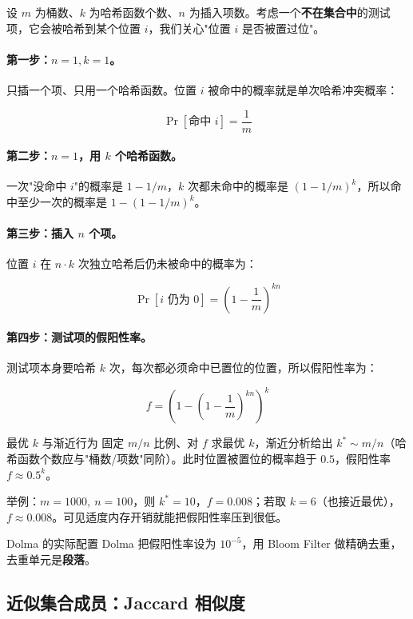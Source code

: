 \documentclass[a4paper]{article}
\begin{document}
设 $m$ 为桶数、$k$ 为哈希函数个数、$n$ 为插入项数。考虑一个\textbf{不在集合中}的测试项，它会被哈希到某个位置 $i$，我们关心"位置 $i$ 是否被置过位"。

\paragraph{第一步：$n=1, k=1$。}只插一个项、只用一个哈希函数。位置 $i$ 被命中的概率就是单次哈希冲突概率：

\[
\Pr[\text{命中 } i] = \frac{1}{m}
\]

\paragraph{第二步：$n=1$，用 $k$ 个哈希函数。}一次"没命中 $i$"的概率是 $1 - 1/m$，$k$ 次都未命中的概率是 $(1-1/m)^k$，所以命中至少一次的概率是 $1 - (1-1/m)^k$。

\paragraph{第三步：插入 $n$ 个项。}位置 $i$ 在 $n \cdot k$ 次独立哈希后仍未被命中的概率为：

\[
\Pr[i \text{ 仍为 } 0] = \left(1 - \frac{1}{m}\right)^{kn}
\]

\paragraph{第四步：测试项的假阳性率。}测试项本身要哈希 $k$ 次，每次都必须命中已置位的位置，所以假阳性率为：

\[
f = \left(1 - \left(1 - \frac{1}{m}\right)^{kn}\right)^k
\]

\begin{importantbox}{最优 $k$ 与渐近行为}
固定 $m/n$ 比例、对 $f$ 求最优 $k$，渐近分析给出 $k^\ast \sim m/n$（哈希函数个数应与"桶数/项数"同阶）。此时位置被置位的概率趋于 $0.5$，假阳性率 $f \approx 0.5^k$。
\par
举例：$m=1000,\ n=100$，则 $k^\ast=10$，$f=0.008$；若取 $k=6$（也接近最优），$f \approx 0.008$。可见适度内存开销就能把假阳性率压到很低。
\end{importantbox}

\begin{practicebox}{Dolma 的实际配置}
Dolma 把假阳性率设为 $10^{-5}$，用 Bloom Filter 做精确去重，去重单元是\textbf{段落}。
\end{practicebox}

\subsection{近似集合成员：Jaccard 相似度}
\end{document}
